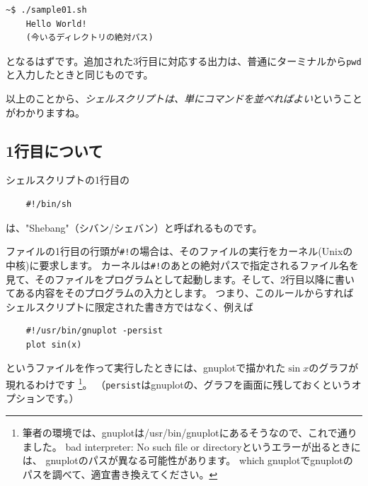 \documentclass[a4j]{ltjsreport}
\begin{document}
    \begin{lstlisting}[numbers=none]
    ~$ ./sample01.sh
    Hello World!
    (今いるディレクトリの絶対パス)
    \end{lstlisting}
    となるはずです。追加された3行目に対応する出力は、普通にターミナルから\texttt{pwd}と入力したときと同じものです。

    以上のことから、\emph{シェルスクリプトは、単にコマンドを並べればよい}ということがわかりますね。

    \subsection{1行目について}
    シェルスクリプトの1行目の
    \begin{lstlisting}
    #!/bin/sh
    \end{lstlisting}
    は、"Shebang"（シバン/シェバン）と呼ばれるものです。

    ファイルの1行目の行頭が\texttt{\#!}の場合は、そのファイルの実行をカーネル(Unixの中核)に要求します。
    カーネルは\texttt{\#!}のあとの絶対パスで指定されるファイル名を見て、そのファイルをプログラムとして起動します。そして、2行目以降に書いてある内容をそのプログラムの入力とします。
    つまり、このルールからすればシェルスクリプトに限定された書き方ではなく、例えば
    \begin{lstlisting}
    #!/usr/bin/gnuplot -persist
    plot sin(x)
    \end{lstlisting}
    というファイルを作って実行したときには、gnuplotで描かれた$\sin x$のグラフが現れるわけです
    \footnote{筆者の環境では、gnuplotは/usr/bin/gnuplotにあるそうなので、これで通りました。
    bad interpreter: No such file or directoryというエラーが出るときには、
    gnuplotのパスが異なる可能性があります。
    which gnuplotでgnuplotのパスを調べて、適宜書き換えてください。}。
    （\texttt{persist}はgnuplotの、グラフを画面に残しておくというオプションです。）
\end{document}
